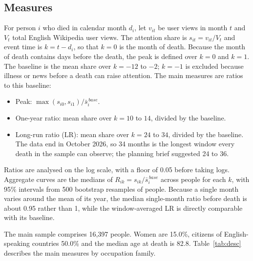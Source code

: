 \documentclass[11pt,a4paper]{article}
\begin{document}
\subsection{Measures}
For person $i$ who died in calendar month $d_i$, let $v_{it}$ be user views in month $t$ and $V_t$ total English Wikipedia user views. The attention share is $s_{it} = v_{it} / V_t$ and event time is $k = t - d_i$, so that $k = 0$ is the month of death. Because the month of death contains days before the death, the peak is defined over $k = 0$ and $k = 1$. The baseline is the mean share over $k = -12$ to $-2$; $k = -1$ is excluded because illness or news before a death can raise attention. The main measures are ratios to this baseline:
\begin{itemize}
\item Peak: $\max(s_{i0}, s_{i1}) / \bar s_i^{\,base}$.
\item One-year ratio: mean share over $k = 10$ to $14$, divided by the baseline.
\item Long-run ratio (LR): mean share over $k = 24$ to $34$, divided by the baseline. The data end in October 2026, so 34 months is the longest window every death in the sample can observe; the planning brief suggested 24 to 36.
\end{itemize}
Ratios are analysed on the log scale, with a floor of 0.05 before taking logs. Aggregate curves are the medians of $R_{ik} = s_{ik} / \bar s_i^{\,base}$ across people for each $k$, with 95\% intervals from 500 bootstrap resamples of people. Because a single month varies around the mean of its year, the median single-month ratio before death is about 0.95 rather than 1, while the window-averaged LR is directly comparable with its baseline.

The main sample comprises 16,397 people. Women are 15.0\%, citizens of English-speaking countries 50.0\% and the median age at death is 82.8. Table~\ref{tab:desc} describes the main measures by occupation family.
\end{document}
